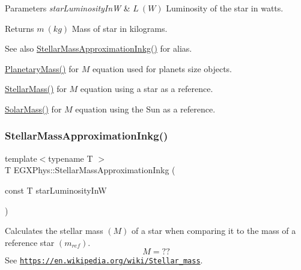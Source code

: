 \begin{DoxyParams}{Parameters}
{\em star\+Luminosity\+InW} & $L\ (W)$ Luminosity of the star in watts. \\
\hline
\end{DoxyParams}
\begin{DoxyReturn}{Returns}
$m\ (kg)$ Mass of star in kilograms. 
\end{DoxyReturn}
\begin{DoxySeeAlso}{See also}
\mbox{\hyperlink{group___e_g_x_phys-_stellar_mass_ga1863cc210a7e0aa0c681774e719fcd21}{Stellar\+Mass\+Approximation\+Inkg()}} for alias. 

\mbox{\hyperlink{group___e_g_x_phys-_planetary_mass_ga225bcf56fb37468f6d4d46493d403503}{Planetary\+Mass()}} for $M$ equation used for planets size objects. 

\mbox{\hyperlink{group___e_g_x_phys-_stellar_mass_ga6c1b42cfd62e3174709ddbf15a87b460}{Stellar\+Mass()}} for $M$ equation using a star as a reference. 

\mbox{\hyperlink{group___e_g_x_phys-_stellar_mass_ga4988f903a27ec9cfa63f72b003d876fd}{Solar\+Mass()}} for $M$ equation using the Sun as a reference. 
\end{DoxySeeAlso}
\mbox{\label{group___e_g_x_phys-_stellar_mass_ga1863cc210a7e0aa0c681774e719fcd21}} 
\subsubsection{\texorpdfstring{Stellar\+Mass\+Approximation\+Inkg()}{StellarMassApproximationInkg()}}
{\footnotesize\ttfamily template$<$typename T $>$ \\
T E\+G\+X\+Phys\+::\+Stellar\+Mass\+Approximation\+Inkg (\begin{DoxyParamCaption}\item[{const T}]{star\+Luminosity\+InW }\end{DoxyParamCaption})}



Calculates the stellar mass $(M)$ of a star when comparing it to the mass of a reference star $(m_{ref})$. \[M=??\] See \href{https://en.wikipedia.org/wiki/Stellar_mass}{\tt https\+://en.\+wikipedia.\+org/wiki/\+Stellar\+\_\+mass}. 


